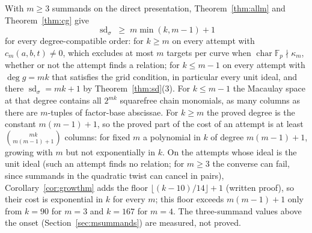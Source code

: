 \documentclass[11pt]{article}
\theoremstyle{definition}\newtheorem{definition}[theorem]{Definition}
\theoremstyle{remark}\newtheorem{remark}[theorem]{Remark}
\newcommand{\F}{\mathbb F}
\newcommand{\sd}{\operatorname{sd}}
\begin{document}
With $m\ge3$ summands on the direct presentation, Theorem~\ref{thm:allm}
and Theorem~\ref{thm:cg} give
\[
 \sd_\sigma\;\ge\;m\min(k,m-1)+1
\]
for every degree-compatible order: for $k\ge m$ on every attempt with
$c_m(a,b,t)\ne0$, which excludes at most $m$ targets per curve when
$\operatorname{char}\F_p\nmid\kappa_m$, whether or not the attempt finds a
relation; for $k\le m-1$ on every attempt with $\deg g=mk$ that satisfies
the grid condition, in particular every unit ideal, and there
$\sd_\sigma=mk+1$ by Theorem~\ref{thm:sd}(3). For $k\le m-1$ the Macaulay
space at that degree contains all $2^{mk}$ squarefree chain monomials, as
many columns as there are $m$-tuples of factor-base abscissae. For $k\ge m$
the proved degree is the constant $m(m-1)+1$, so the proved part of the cost
of an attempt is at least $\binom{mk}{m(m-1)+1}$ columns: for fixed $m$ a
polynomial in $k$ of degree $m(m-1)+1$, growing with $m$ but not
exponentially in $k$. On the attempts whose ideal is the unit ideal (such
an attempt finds no relation; for $m\ge3$ the converse can fail, since
summands in the quadratic twist can cancel in pairs),
Corollary~\ref{cor:growthm} adds the floor $\lfloor(k-10)/14\rfloor+1$
(written proof), so their cost is exponential in $k$ for every $m$; this
floor exceeds $m(m-1)+1$ only from $k=90$ for $m=3$ and $k=167$ for $m=4$.
The three-summand values above the onset (Section~\ref{sec:msummands}) are
measured, not proved.
\end{document}
